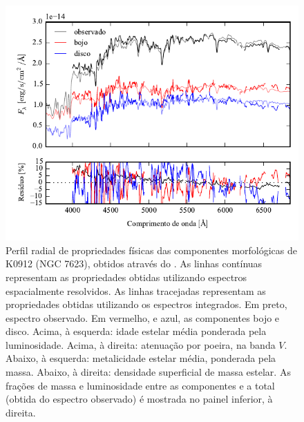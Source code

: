 \begin{figure}
	\includegraphics[page=18]{figuras/sample006a_synthesis}
	\caption[Propriedades físicas das componentes morfológicas de K0912 (NGC 7623)]
	{Perfil radial de propriedades físicas das componentes morfológicas de
	K0912 (NGC 7623), obtidos através do \starlight. As linhas contínuas
	representam as propriedades obtidas utilizando espectros espacialmente
	resolvidos. As linhas tracejadas representam as propriedades obtidas utilizando
	os espectros integrados. Em preto, espectro observado. Em vermelho, e azul, as
	componentes bojo e disco. Acima, à esquerda: idade estelar média ponderada pela
	luminosidade. Acima, à direita: atenuação por poeira, na banda $V$. Abaixo, à
	esquerda: metalicidade estelar média, ponderada pela massa. Abaixo, à direita:
	densidade superficial de massa estelar. As frações de massa e luminosidade
	entre as componentes e a total (obtida do espectro observado) é mostrada no
	painel inferior, à direita.}
	\label{fig:decompSinteseRadprof:K0912}
\end{figure}

